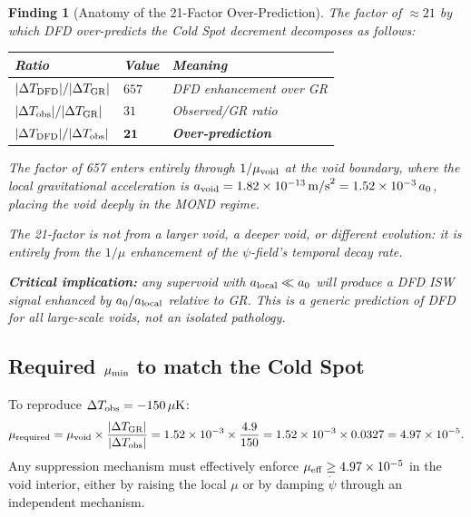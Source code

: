 \documentclass[11pt]{article}
\newtheorem{finding}{Finding}
\newcommand{\ee}[1]{\times 10^{#1}}
\newcommand{\mufd}{\mu}
\newcommand{\DFD}{{\rm DFD}}
\newcommand{\GR}{{\rm GR}}
\newcommand{\mumin}{\mu_{\rm min}}
\newcommand{\deltaT}{\Delta T}
\begin{document}
\begin{finding}[Anatomy of the 21-Factor Over-Prediction]\label{find:anatomy}
The factor of $\approx 21$ by which DFD over-predicts the Cold Spot
decrement decomposes as follows:
\begin{center}
\begin{tabular}{lll}
\toprule
Ratio & Value & Meaning \\
\midrule
$|\deltaT_{\DFD}|/|\deltaT_{\GR}|$ & $657$ & DFD enhancement over GR \\
$|\deltaT_{\rm obs}|/|\deltaT_{\GR}|$ & $31$ & Observed/GR ratio \\
$|\deltaT_{\DFD}|/|\deltaT_{\rm obs}|$ & $\mathbf{21}$ & \textbf{Over-prediction} \\
\bottomrule
\end{tabular}
\end{center}
\noindent The factor of 657 enters entirely through $1/\mufd_{\rm void}$
at the void boundary, where the local gravitational acceleration is
$a_{\rm void} = 1.82\ee{-13}\,{\rm m/s}^2 = 1.52\ee{-3}\,a_0$, placing
the void deeply in the MOND regime.

\noindent The 21-factor is \emph{not} from a larger void, a deeper void,
or different evolution: it is \textit{entirely} from the $1/\mufd$
enhancement of the $\psi$-field's temporal decay rate.

\noindent\textbf{Critical implication:} any supervoid with $a_{\rm local}
\ll a_0$ will produce a DFD ISW signal enhanced by $a_0/a_{\rm local}$
relative to GR. This is a \textit{generic} prediction of DFD for all
large-scale voids, not an isolated pathology.
\end{finding}

\subsection{Required $\mumin$ to match the Cold Spot}

To reproduce $\deltaT_{\rm obs} = -150\,\mu{\rm K}$:
\begin{equation}\label{eq:mu-required}
  \mufd_{\rm required}
  = \mufd_{\rm void}\times\frac{|\deltaT_{\GR}|}{|\deltaT_{\rm obs}|}
  = 1.52\ee{-3}\times\frac{4.9}{150}
  = 1.52\ee{-3}\times 0.0327
  = 4.97\ee{-5}.
\end{equation}
Any suppression mechanism must effectively enforce $\mufd_{\rm eff} \geq
4.97\ee{-5}$ in the void interior, either by raising the local $\mufd$
or by damping $\dot\psi$ through an independent mechanism.
\end{document}

